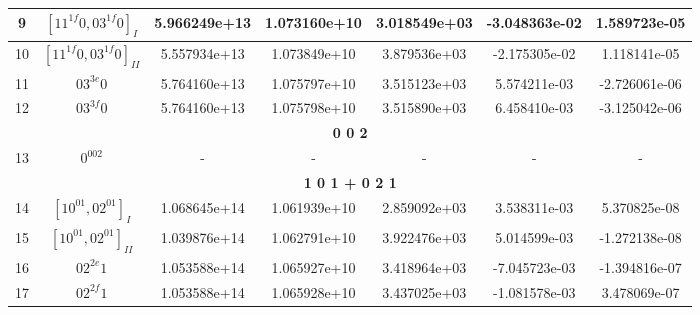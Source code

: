 \begin{table}[h!]
\begin{tabular}{|c|c|c|c|c|c|c|}
9 & $[11^{1f}0, 03^{1f}0]_{I}$ & 5.966249e+13 & 1.073160e+10 & 3.018549e+03 & -3.048363e-02 & 1.589723e-05 \\ \hline
10 & $[11^{1f}0, 03^{1f}0]_{II}$ & 5.557934e+13 & 1.073849e+10 & 3.879536e+03 & -2.175305e-02 & 1.118141e-05 \\ \hline
11 & $03^{3e}0$ & 5.764160e+13 & 1.075797e+10 & 3.515123e+03 & 5.574211e-03 & -2.726061e-06 \\ \hline
12 & $03^{3f}0$ & 5.764160e+13 & 1.075798e+10 & 3.515890e+03 & 6.458410e-03 & -3.125042e-06 \\ \hline
\multicolumn{7}{|c|}{\textbf{0 0 2}} \\ \hline
13 & $0^002$ & - & - & - & - & - \\ \hline
\multicolumn{7}{|c|}{\textbf{1 0 1 + 0 2 1}} \\ \hline
14 & $[10^01, 02^01]_{I}$ & 1.068645e+14 & 1.061939e+10 & 2.859092e+03 & 3.538311e-03 & 5.370825e-08 \\ \hline
15 & $[10^01, 02^01]_{II}$ & 1.039876e+14 & 1.062791e+10 & 3.922476e+03 & 5.014599e-03 & -1.272138e-08 \\ \hline
16 & $02^{2e}1$ & 1.053588e+14 & 1.065927e+10 & 3.418964e+03 & -7.045723e-03 & -1.394816e-07 \\ \hline
17 & $02^{2f}1$ & 1.053588e+14 & 1.065928e+10 & 3.437025e+03 & -1.081578e-03 & 3.478069e-07 \\ \hline
\end{tabular}
\end{table}
